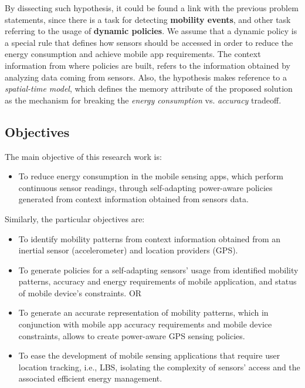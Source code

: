 \documentclass[ENG,PhD]{cinvestav}
\begin{document}
By dissecting such hypothesis, it could be found a link with the previous problem statements, since there is a task for detecting \textbf{mobility events}, and other task referring to the usage of \textbf{dynamic policies}.
We assume that a dynamic policy is a special rule that defines how sensors should be accessed in order to reduce the energy consumption and achieve mobile app requirements. 
The context information from where policies are built, refers to the information obtained by analyzing data coming from sensors.
Also, the hypothesis makes reference to a \emph{spatial-time model}, which defines the memory attribute of the proposed solution as the mechanism for breaking the \emph{energy consumption} vs. \emph{accuracy} tradeoff.


\subsection{Objectives}
The main objective of this research work is:
\begin{itemize}
  \item To reduce energy consumption in the mobile sensing apps, which perform continuous sensor readings, through self-adapting power-aware policies generated from context information obtained from sensors data.
\end{itemize}

Similarly, the particular objectives are:
\begin{itemize}
  \item To identify mobility patterns from context information obtained from an inertial sensor (accelerometer) and location providers (GPS).
  \item To generate policies for a self-adapting sensors' usage from identified mobility patterns, accuracy and energy requirements of mobile application, and status of mobile device's constraints.  OR
  \item To generate an accurate representation of mobility patterns, which in conjunction with mobile app accuracy requirements and mobile device constraints, allows to create power-aware GPS sensing policies.
  \item To ease the development of mobile sensing applications that require user location tracking, i.e., LBS, isolating the complexity of sensors' access and the associated efficient energy management.
\end{itemize}
\end{document}
